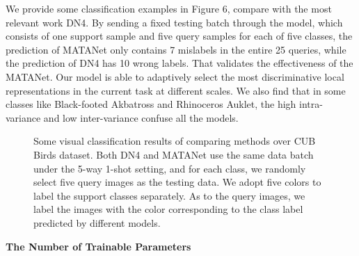 \documentclass[final]{cvpr}
\begin{document}
We provide some classification examples in Figure 6, compare with the most relevant work DN4. By sending a fixed testing batch through the model, which consists of one support sample and five query samples for each of five classes, the prediction of MATANet only contains 7 mislabels in the entire 25 queries, while the prediction of DN4 has 10 wrong labels. That validates the effectiveness of the MATANet. Our model is able to adaptively select the most discriminative local representations in the current task at different scales. We also find that in some classes like Black-footed Akbatross and Rhinoceros Auklet, the high intra-variance and low inter-variance confuse all the models.

\begin{figure}[h]
	\centering          
	      \caption{Some visual classification results of comparing methods over CUB Birds dataset. Both DN4 and MATANet use the same data batch under the 5-way 1-shot setting, and for each class, we randomly select five query images as the testing data. We adopt five colors to label the support classes separately. As to the query images, we label the images with the color corresponding to the class label predicted by different models.}      \label{fig2}  
\end{figure}


\noindent
\textbf{The Number of Trainable Parameters}
\end{document}
